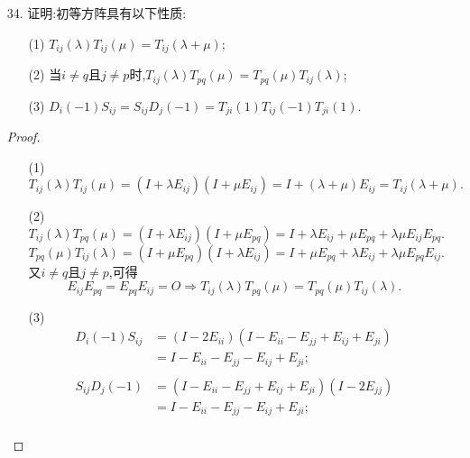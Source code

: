 \documentclass{article}
\begin{document}
\begin{enumerate}
\begin{proof}
\[{\begin{pmatrix}
            \vdots & \vdots & &\vdots \\
            1 & x_n & \cdots & {x_n}^n
        \end{pmatrix}}^{-1}
        \begin{pmatrix}
            y_0\\
            y_1\\
            \vdots\\
            y_n 
        \end{pmatrix}.
    \]        
    即证存在唯一的$a_0,a_1,\ldots,a_n$使得$p(x)=a_0 + a_1 x + \cdots + a_n x^n$满足$p(x_i)=y_i\ (i=0,1,\ldots,n)$.
    \end{proof}
    \item [34.]证明:初等方阵具有以下性质:
    \begin{enumerate}
        \item [(1)]$T_{ij}(\lambda)T_{ij}(\mu)=T_{ij}(\lambda+\mu)$;
        \item [(2)]当$i\neq q$且$j\neq p$时,$T_{ij}(\lambda)T_{pq}(\mu)=T_{pq}(\mu)T_{ij}(\lambda)$;
        \item [(3)]$D_{i}(-1)S_{ij}=S_{ij}D_{j}(-1)=T_{ji}(1)T_{ij}(-1)T_{ji}(1)$.
    \end{enumerate}
    \begin{proof}
    \begin{enumerate}
        \item [(1)]\[T_{ij}(\lambda)T_{ij}(\mu)=(I+\lambda E_{ij})(I+\mu E_{ij})=I+(\lambda+\mu)E_{ij}=T_{ij}(\lambda+\mu).\]
        \item [(2)]
        \[T_{ij}(\lambda)T_{pq}(\mu)=(I+\lambda E_{ij})(I+\mu E_{pq})=I+\lambda E_{ij}+\mu E_{pq}+\lambda\mu E_{ij}E_{pq}.\]
        \[T_{pq}(\mu)T_{ij}(\lambda)=(I+\mu E_{pq})(I+\lambda E_{ij})=I+\mu E_{pq}+\lambda E_{ij}+\lambda\mu E_{pq}E_{ij}.\]
        又$i\neq q$且$j\neq p$,可得
        \[E_{ij} E_{pq}=E_{pq} E_{ij}=O \Rightarrow T_{ij}(\lambda)T_{pq}(\mu)=T_{pq}(\mu)T_{ij}(\lambda).\]
        \item [(3)]
        \begin{align*}
            D_{i}(-1)S_{ij}
            &=(I-2E_{ii})(I-E_{ii}-E_{jj}+E_{ij}+E_{ji})\\
            &=I-E_{ii}-E_{jj}-E_{ij}+E_{ji};\\
            \\
            S_{ij}D_{j}(-1)
            &=(I-E_{ii}-E_{jj}+E_{ij}+E_{ji})(I-2E_{jj})\\
            &=I-E_{ii}-E_{jj}-E_{ij}+E_{ji};\\

\end{align*}
\end{enumerate}
\end{proof}
\end{enumerate}
\end{document}
